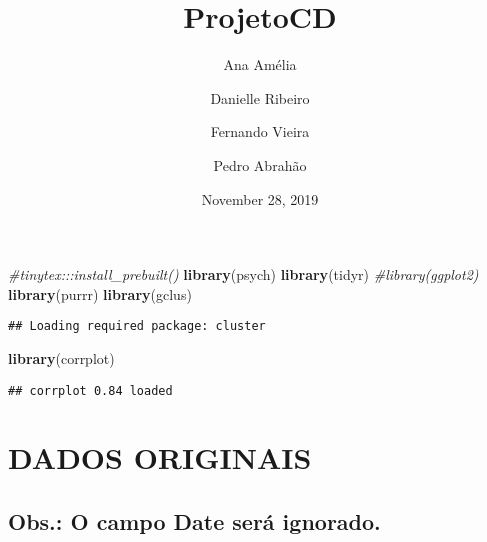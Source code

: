 \documentclass[]{article}
\title{ProjetoCD}
\author{Ana Amélia \and Danielle Ribeiro \and Fernando Vieira \and Pedro Abrahão}
\date{November 28, 2019}
\newenvironment{Shaded}{\begin{snugshade}}{\end{snugshade}}
\newcommand{\KeywordTok}[1]{\textcolor[rgb]{0.13,0.29,0.53}{\textbf{#1}}}
\newcommand{\CommentTok}[1]{\textcolor[rgb]{0.56,0.35,0.01}{\textit{#1}}}
\newcommand{\NormalTok}[1]{#1}
\begin{document}
\maketitle

\newcommand{\mar}{\hspace{.3cm}}
\newcommand{\ld}{\vspace{.15cm}}




\begin{Shaded}
\begin{Highlighting}[]
\CommentTok{#tinytex:::install_prebuilt()}
\KeywordTok{library}\NormalTok{(psych)}
\KeywordTok{library}\NormalTok{(tidyr)}
\CommentTok{#library(ggplot2)}
\KeywordTok{library}\NormalTok{(purrr)}
\KeywordTok{library}\NormalTok{(gclus)}
\end{Highlighting}
\end{Shaded}

\begin{verbatim}
## Loading required package: cluster
\end{verbatim}

\begin{Shaded}
\begin{Highlighting}[]
\KeywordTok{library}\NormalTok{(corrplot)}
\end{Highlighting}
\end{Shaded}

\begin{verbatim}
## corrplot 0.84 loaded
\end{verbatim}

\section{DADOS ORIGINAIS}\label{dados-originais}

\subsection{Obs.: O campo Date será
ignorado.}\label{obs.-o-campo-date-seruxe1-ignorado.}
\end{document}
